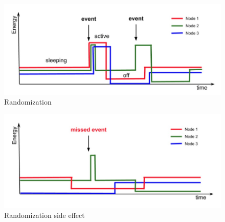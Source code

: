 \begin{figure}
		\centering
		\includegraphics[width=\columnwidth]{figures/randomization}
		\caption{ Randomization}
		\label{fig:noRand}
\end{figure} 

\begin{figure}
		\centering
		\includegraphics[width=\columnwidth]{figures/randomizationSideEffect}
		\caption{ Randomization side effect}
		\label{fig:noRand}
\end{figure} 


